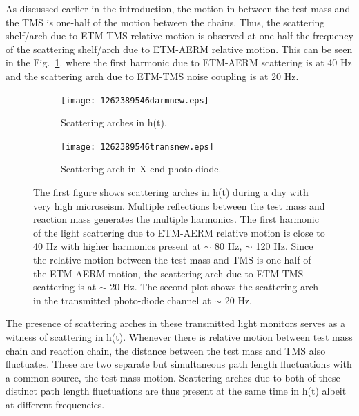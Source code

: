 \documentclass[12pt]{iopart}
\begin{document}
As discussed earlier in the introduction, the motion in between the test mass and the TMS is one-half of the motion between the chains.
Thus, the scattering shelf/arch due to ETM-TMS relative motion is observed at one-half the frequency of the scattering shelf/arch due to ETM-AERM relative motion. This can be seen in the Fig.~\ref{fig:1262darm}. where the first harmonic due to ETM-AERM scattering is at 40 Hz and the scattering arch due to ETM-TMS noise coupling is at 20 Hz.

\begin{figure}[h]
   \centering
    \begin{subfigure}[b]{0.45\textwidth}
        \centering
         \texttt{[image: 1262389546darmnew.eps]}
         \caption{Scattering arches in h(t).}
         \label{fig:1262darm}
    \end{subfigure}
    \begin{subfigure}[b]{0.45\textwidth}
        \centering
         \texttt{[image: 1262389546transnew.eps]}
         \caption{Scattering arch in X end photo-diode.}
         \label{fig:1262trans}
         
    
    \end{subfigure}
    \caption{The first figure shows scattering arches in h(t) during a day with very high microseism. Multiple reflections between the test mass and reaction mass generates the multiple harmonics. The first harmonic of the light scattering due to ETM-AERM relative motion is close to 40 Hz with higher harmonics present at $\sim$ 80 Hz, $\sim$ 120 Hz. Since the relative motion between the test mass and TMS is one-half of the ETM-AERM motion, the scattering arch due to ETM-TMS scattering is at $\sim$ 20 Hz. The second plot shows the scattering arch in the transmitted photo-diode channel at $\sim$ 20 Hz.}
    \label{fig:1262scat}
    
\end{figure}
The presence of scattering arches in these transmitted light monitors serves as a witness of scattering in h(t). Whenever there is relative motion between test mass chain and reaction chain, the distance between the test mass and TMS also fluctuates. These are two separate but simultaneous path length fluctuations with a common source, the test mass motion. Scattering arches due to both of these distinct path length fluctuations are thus present at the same time in h(t) albeit at different frequencies.
\end{document}
